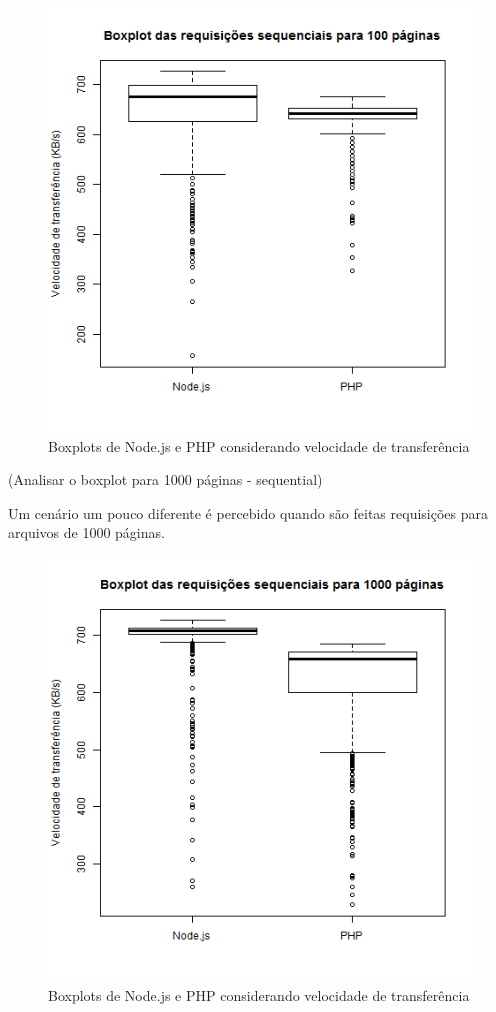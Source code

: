 \documentclass[conference,compsoc]{IEEEtran}
\begin{document}
\begin{figure}[h!]
\centering
  \includegraphics[scale=0.35]{plots/boxplots/sequential/SPEED_DOWNLOAD/boxplot_SPEED_DOWNLOAD_100_pages_processed.png}
  \caption{Boxplots de Node.js e PHP considerando velocidade de transferência}
    \label{fig:boxplot_speed_download_sequential_100}
\end{figure}

(Analisar o boxplot para 1000 páginas - sequential)

Um cenário um pouco diferente é percebido quando são feitas requisições para arquivos de 1000 páginas. 

\begin{figure}[h!]
\centering
  \includegraphics[scale=0.35]{plots/boxplots/sequential/SPEED_DOWNLOAD/boxplot_SPEED_DOWNLOAD_1000_pages_processed.png}
  \caption{Boxplots de Node.js e PHP considerando velocidade de transferência}
    \label{fig:boxplot_speed_download_concurrent_100}
\end{figure}
\end{document}
